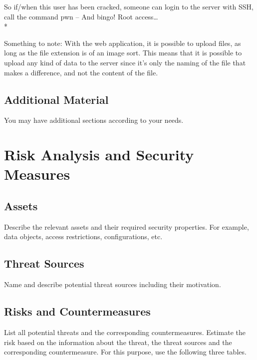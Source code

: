 \documentclass{article}
\begin{document}
So if/when this user has been cracked, someone can login to the server with SSH, call the command pwn – And bingo! Root access…\\*

Something to note:
With the web application, it is possible to upload files, as long as the file extension is of an image sort. This means that it is possible to upload any kind of data to the server since it’s only the naming of the file that makes a difference, and not the content of the file. 


\subsection{Additional Material}

You may have additional sections according to your needs.


\section{Risk Analysis and Security Measures}

\subsection{Assets}

Describe the relevant assets and their required security
  properties. For example, data objects, access restrictions,
  configurations, etc.

\subsection{Threat Sources}

Name and describe potential threat sources including their motivation.

\subsection{Risks and Countermeasures}

List all potential threats and the
  corresponding countermeasures. Estimate the risk based on 
  the information about the threat, the threat sources and the 
  corresponding countermeasure. For this purpose, use the following three
  tables.

\end{document}
